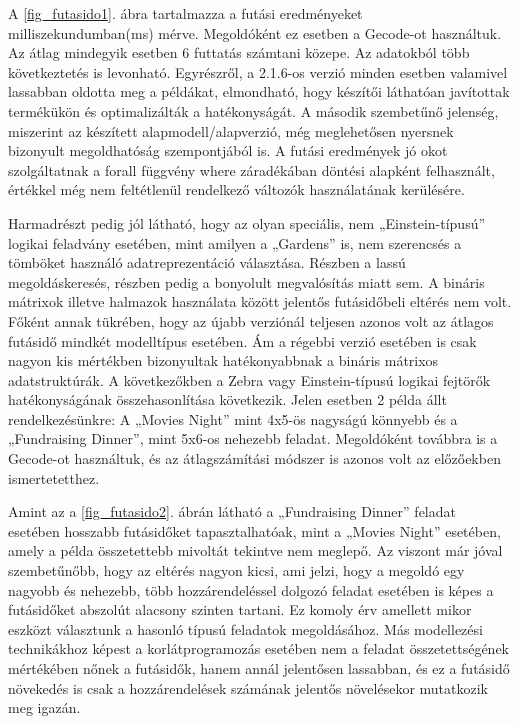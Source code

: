 \documentclass[12pt,a4paper]{report}
\begin{document}

    A \ref{fig_futasido1}. ábra tartalmazza a futási eredményeket milliszekundumban(ms) mérve.
    Megoldóként ez esetben a Gecode-ot használtuk.
    Az átlag mindegyik esetben 6 futtatás számtani közepe.
    Az adatokból több következtetés is levonható.
    Egyrészről, a 2.1.6-os verzió minden esetben valamivel lassabban oldotta meg a példákat, elmondható, hogy készítői láthatóan javítottak termékükön és optimalizálták a hatékonyságát.
    A második szembetűnő jelenség, miszerint az készített alapmodell/alapverzió, még meglehetősen nyersnek bizonyult megoldhatóság szempontjából is.
    A futási eredmények jó okot szolgáltatnak a forall függvény where záradékában döntési alapként felhasznált, értékkel még nem feltétlenül rendelkező változók használatának kerülésére.

    Harmadrészt pedig jól látható, hogy az olyan speciális, nem „Einstein-típusú” logikai feladvány esetében, mint amilyen a „Gardens” is, nem szerencsés a tömböket használó adatreprezentáció választása.
    Részben a lassú megoldáskeresés, részben pedig a bonyolult megvalósítás miatt sem.
    A bináris mátrixok illetve halmazok használata között jelentős futásidőbeli eltérés nem volt.
    Főként annak tükrében, hogy az újabb verziónál teljesen azonos volt az átlagos futásidő mindkét modelltípus esetében.
    Ám a régebbi verzió esetében is csak nagyon kis mértékben bizonyultak hatékonyabbnak a bináris mátrixos adatstruktúrák.
    A következőkben a Zebra vagy Einstein-típusú logikai fejtörők hatékonyságának 
    összehasonlítása következik.
    Jelen esetben 2 példa állt rendelkezésünkre: A „Movies 
    Night” mint 4x5-ös nagyságú könnyebb és a „Fundraising Dinner”, mint 5x6-os nehezebb 
    feladat.
    Megoldóként továbbra is a Gecode-ot használtuk, és az átlagszámítási módszer 
    is azonos volt az előzőekben ismertetetthez.


    Amint az a \ref{fig_futasido2}. ábrán látható a „Fundraising Dinner” feladat esetében hosszabb futásidőket tapasztalhatóak, mint a „Movies Night” esetében, amely a példa összetettebb mivoltát tekintve nem meglepő.
    Az viszont már jóval szembetűnőbb, hogy az eltérés nagyon kicsi, ami jelzi, hogy a megoldó egy nagyobb és nehezebb, több hozzárendeléssel dolgozó feladat esetében is képes a futásidőket abszolút alacsony szinten tartani.
    Ez komoly érv amellett mikor eszközt választunk a hasonló típusú feladatok megoldásához.
    Más modellezési technikákhoz képest a korlátprogramozás esetében nem a feladat összetettségének mértékében nőnek a futásidők, hanem annál jelentősen lassabban, és ez a futásidő növekedés is csak a hozzárendelések számának jelentős növelésekor mutatkozik meg igazán.
\end{document}

